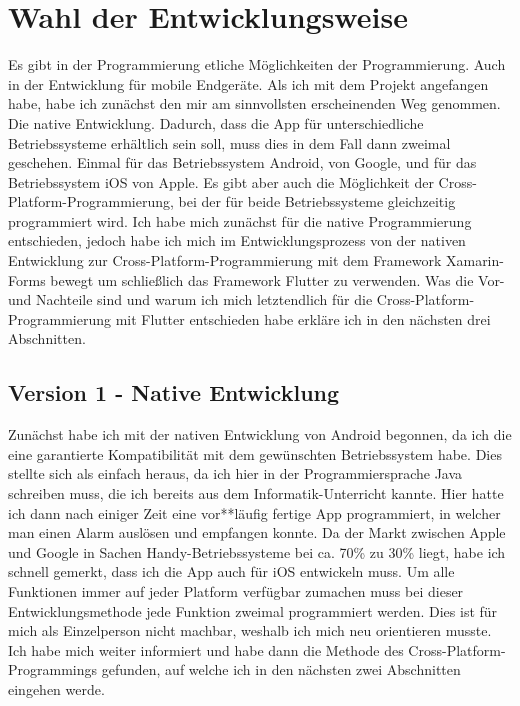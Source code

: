 \section{Wahl der Entwicklungsweise}
Es gibt in der Programmierung etliche Möglichkeiten der Programmierung. Auch in der Entwicklung für mobile Endgeräte.
Als ich mit dem Projekt angefangen habe, habe ich zunächst den mir am sinnvollsten erscheinenden Weg genommen. 
Die native Entwicklung. Dadurch, dass die App für unterschiedliche Betriebssysteme erhältlich sein soll, 
muss dies in dem Fall dann zweimal geschehen. Einmal für das Betriebssystem Android\cite{Android}, von Google, und für
das Betriebssystem iOS\cite{iOS} von Apple. Es gibt aber auch die Möglichkeit der Cross-Platform-Programmierung, bei 
der für beide Betriebssysteme gleichzeitig programmiert wird. Ich habe mich zunächst für die native Programmierung 
entschieden, jedoch habe ich mich im Entwicklungsprozess von der nativen Entwicklung zur Cross-Platform-Programmierung 
mit dem Framework Xamarin-Forms bewegt um schließlich das Framework Flutter zu verwenden. Was die Vor- und Nachteile
sind und warum ich mich letztendlich für die Cross-Platform-Programmierung mit Flutter entschieden habe erkläre ich in 
den nächsten drei Abschnitten.

    \subsection{Version 1 - Native Entwicklung}
    Zunächst habe ich mit der nativen Entwicklung von Android begonnen, da ich die eine garantierte Kompatibilität
    mit dem gewünschten Betriebssystem habe. Dies stellte sich als einfach heraus, da ich hier in der 
    Programmiersprache Java schreiben muss, die ich bereits aus dem Informatik-Unterricht kannte.
    Hier hatte ich dann nach einiger Zeit eine vor**läufig fertige App programmiert, in welcher
    man einen Alarm auslösen und empfangen konnte.
    Da der Markt zwischen Apple und Google in Sachen Handy-Betriebssysteme bei ca. 70\% zu 30\% 
    liegt\cite{Marktanteil}, habe ich schnell gemerkt, dass ich die App auch für iOS entwickeln muss.
    Um alle Funktionen immer auf jeder Platform verfügbar zumachen muss bei dieser Entwicklungsmethode
    jede Funktion zweimal programmiert werden. Dies ist für mich als Einzelperson nicht machbar, weshalb
    ich mich neu orientieren musste. Ich habe mich weiter informiert und habe dann die Methode des 
    Cross-Platform-Programmings gefunden, auf welche ich in den nächsten zwei Abschnitten eingehen werde.
